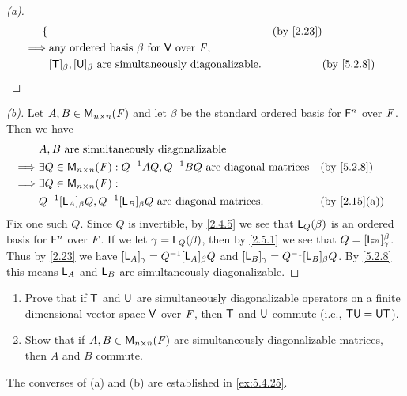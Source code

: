 \begin{proof}[(a)]
\begin{align*}
\begin{dcases}
               \end{dcases} &  & \text{(by \cref{2.23})}                                  \\
    \implies & \text{any ordered basis } \beta \text{ for } \V \text{ over } \F,                                                                                                                                                                                               \\
             & [\T]_{\beta}, [\U]_{\beta} \text{ are simultaneously diagonalizable}.                                                                                                                                                             &  & \text{(by \cref{5.2.8})}
  \end{align*}
\end{proof}

\begin{proof}[(b)]
  Let \(A, B \in \mathsf{M}_{{n} \times n}({\mathit{F}})\) and let \(\beta\) be the standard ordered basis for \(\mathsf{F}^n\) over \(\mathit{F}\).
  Then we have
  \begin{align*}
             & A, B \text{ are simultaneously diagonalizable}                                                                     \\
    \implies & \exists Q \in \ms{n}{n}{\F} : Q^{-1} A Q, Q^{-1} B Q \text{ are diagonal matrices} &  & \text{(by \cref{5.2.8})}   \\
    \implies & \exists Q \in \ms{n}{n}{\F} :                                                                                      \\
             & Q^{-1} [\L_A]_{\beta} Q, Q^{-1} [\L_B]_{\beta} Q \text{ are diagonal matrices}.    &  & \text{(by \cref{2.15}(a))}
  \end{align*}
  Fix one such \(Q\).
  Since \(Q\) is invertible, by \cref{2.4.5} we see that \(\mathsf{L}_Q(\beta)\) is an ordered basis for \(\mathsf{F}^n\) over \(\mathit{F}\).
  If we let \(\gamma = \mathsf{L}_Q(\beta)\), then by \cref{2.5.1} we see that \(Q = [\IT[\vs{F}^n]]_{\gamma}^{\beta}\).
  Thus by \cref{2.23} we have \([\mathsf{L}_A]_{\gamma} = Q^{-1} [\mathsf{L}_A]_{\beta} Q\) and \([\mathsf{L}_B]_{\gamma} = Q^{-1} [\mathsf{L}_B]_{\beta} Q\).
  By \cref{5.2.8} this means \(\mathsf{L}_A\) and \(\mathsf{L}_B\) are simultaneously diagonalizable.
\end{proof}

\begin{ex}\label{ex:5.2.18}
  \begin{enumerate}
    \item Prove that if \(\mathsf{T}\) and \(\mathsf{U}\) are simultaneously diagonalizable operators on a finite dimensional vector space \(\mathsf{V}\) over \(\mathit{F}\), then \(\mathsf{T}\) and \(\mathsf{U}\) commute (i.e., \(\mathsf{T} \mathsf{U} = \mathsf{U} \mathsf{T}\)).
    \item Show that if \(A, B \in \mathsf{M}_{{n} \times n}({\mathit{F}})\) are simultaneously diagonalizable matrices, then \(A\) and \(B\) commute.
  \end{enumerate}
  The converses of (a) and (b) are established in \cref{ex:5.4.25}.
\end{ex}

